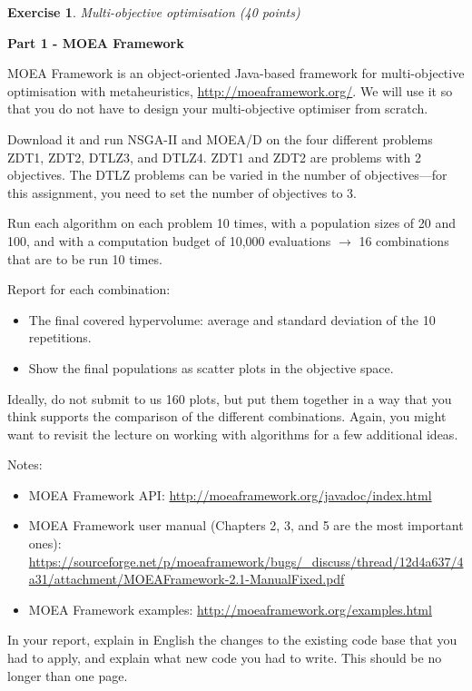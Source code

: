\documentclass{pracs}
\newtheorem{exercise}{Exercise}
\begin{document}
\begin{exercise}
Multi-objective optimisation (40 points)
\end{exercise}

\noindent\textbf{Part 1 - MOEA Framework}

MOEA Framework is an object-oriented Java-based framework for multi-objective optimisation with metaheuristics, \url{http://moeaframework.org/}. We will use it so that you do not have to design your multi-objective optimiser from scratch.

Download it and run NSGA-II and MOEA/D on the four different problems ZDT1, ZDT2, DTLZ3, and DTLZ4. ZDT1 and ZDT2 are problems with 2 objectives. The DTLZ problems can be varied in the number of objectives---for this assignment, you need to set the number of objectives to 3.

Run each algorithm on each problem 10 times, with a population sizes of 20 and 100, and with a computation budget of 10,000 evaluations $\rightarrow$ 16 combinations that are to be run 10 times.

Report for each combination:
\begin{itemize}
\item The final covered hypervolume: average and standard deviation of the 10 repetitions.
\item Show the final populations as scatter plots in the objective space. 
\end{itemize}

Ideally, do not submit to us 160 plots, but put them together in a way that you think supports the comparison of the different combinations. Again, you might want to revisit the lecture on working with algorithms for a few additional ideas.

Notes:
\begin{itemize}
\item MOEA Framework API: \url{http://moeaframework.org/javadoc/index.html}
\item MOEA Framework user manual (Chapters 2, 3, and 5 are the most important ones): \url{https://sourceforge.net/p/moeaframework/bugs/_discuss/thread/12d4a637/4a31/attachment/MOEAFramework-2.1-ManualFixed.pdf}
\item MOEA Framework examples: \url{http://moeaframework.org/examples.html}
\end{itemize}

In your report, explain in English the changes to the existing code base that you had to apply, and explain what new code you had to write. This should be no longer than one page.
\end{document}
